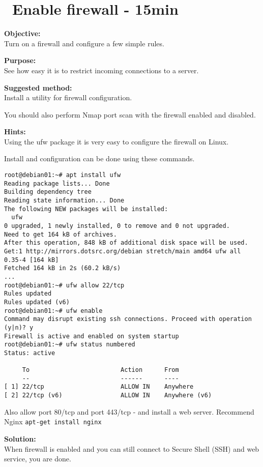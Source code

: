 \documentclass[a4paper,11pt,notitlepage]{report}
\begin{document}
\chapter{\faInfoCircle\ Enable firewall - 15min}
\label{ex:debian-firewall}

{\bf Objective:}\\
Turn on a firewall and configure a few simple rules.

{\bf Purpose:}\\
See how easy it is to restrict incoming connections to a server.


{\bf Suggested method:}\\
Install a utility for firewall configuration.

You should also perform Nmap port scan with the firewall enabled and disabled.

{\bf Hints:}\\
Using the ufw package it is very easy to configure the firewall on Linux.

Install and configuration can be done using these commands.
\begin{verbatim}
root@debian01:~# apt install ufw
Reading package lists... Done
Building dependency tree
Reading state information... Done
The following NEW packages will be installed:
  ufw
0 upgraded, 1 newly installed, 0 to remove and 0 not upgraded.
Need to get 164 kB of archives.
After this operation, 848 kB of additional disk space will be used.
Get:1 http://mirrors.dotsrc.org/debian stretch/main amd64 ufw all 0.35-4 [164 kB]
Fetched 164 kB in 2s (60.2 kB/s)
...
root@debian01:~# ufw allow 22/tcp
Rules updated
Rules updated (v6)
root@debian01:~# ufw enable
Command may disrupt existing ssh connections. Proceed with operation (y|n)? y
Firewall is active and enabled on system startup
root@debian01:~# ufw status numbered
Status: active

     To                         Action      From
     --                         ------      ----
[ 1] 22/tcp                     ALLOW IN    Anywhere
[ 2] 22/tcp (v6)                ALLOW IN    Anywhere (v6)
\end{verbatim}

Also allow port 80/tcp and port 443/tcp - and install a web server. Recommend Nginx \verb+apt-get install nginx+

{\bf Solution:}\\
When firewall is enabled and you can still connect to Secure Shell (SSH) and web service, you are done.
\end{document}
